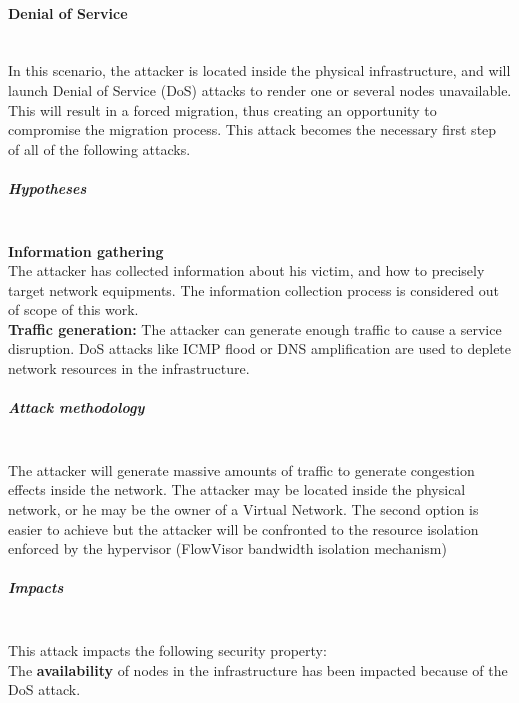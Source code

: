 \paragraph{Denial of Service}\textbf{\\}
In this scenario, the attacker is located inside the physical infrastructure, and will launch Denial of Service (DoS) attacks to render one or several nodes unavailable.
This will result in a forced migration, thus creating an opportunity to compromise the migration process.
This attack becomes the necessary first step of all of the following attacks.

\subparagraph{Hypotheses}\textbf{\\}
\textbf{Information gathering}\textbf{\\}
The attacker has collected information about his victim, and how to precisely target network equipments.
The information collection process is considered out of scope of this work.\\
\textbf{Traffic generation:} The attacker can generate enough traffic to cause a service disruption.
DoS attacks like ICMP flood or DNS amplification are used to deplete network resources in the infrastructure.

\subparagraph{Attack methodology}\textbf{\\}
The attacker will generate massive amounts of traffic to generate congestion effects inside the network. The attacker may be located inside the physical network, or he may be the owner of a Virtual Network. The second option is easier to achieve but the attacker will be confronted to the resource isolation enforced by the hypervisor (\ie FlowVisor bandwidth isolation mechanism)


\subparagraph{Impacts}\textbf{\\}
This attack impacts the following security property:\\
The \textbf{availability} of nodes in the infrastructure has been impacted because of the DoS attack.

